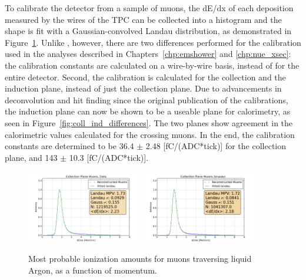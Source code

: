 To calibrate the detector from a sample of muons, the dE/dx of each deposition measured by the wires of the TPC can be collected into a histogram and the shape is fit with a Gaussian-convolved Landau distribution, as demonstrated in Figure~\ref{fig:coll_mpv_muons}.  Unlike \cite{Anderson:2012mra}, however, there are two differences performed for the calibration used in the analyses described in Chapters~\ref{chp:emshower} and \ref{chp:nue_xsec}: the calibration constants are calculated on a wire-by-wire basis, instead of for the entire detector.  Second, the calibration is calculated for the collection and the induction plane, instead of just the collection plane.  Due to advancements in deconvolution and hit finding since the original publication of the \argoneut calibrations, the induction plane can now be shown to be a useable plane for calorimetry, as seen in Figure~\ref{fig:coll_ind_differences}.  The two planes show agreement in the calorimetric values calculated for the crossing muons.  In the end, the calibration constants are determined to be 36.4 $\pm$ 2.48 [fC/(ADC*tick)] for the collection plane, and 143 $\pm$ 10.3 [fC/(ADC*tick)].

\begin{figure}[tb]
  \centering
  \includegraphics[width=0.45\textwidth]{lartpc_figures/collection_muons_total.png}
  \includegraphics[width=0.45\textwidth]{lartpc_figures/collection_muons_total_sim.png}
  \caption[Muon dE/dx Distributions]{Most probable ionization amounts for muons traversing liquid Argon, as a function of momentum.}
  \label{fig:coll_mpv_muons}
\end{figure}

